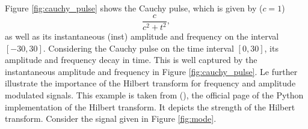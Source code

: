 \documentclass[../Main/thesis.tex]{subfiles}
\begin{document}
\justify
Figure \ref{fig:cauchy_pulse} shows the Cauchy pulse, which is given by ($c=1$)
\begin{equation}
	 \frac{c}{c^{2}+ t^{2}},
\end{equation}
as well as its instantaneous (inst) amplitude and frequency on the interval $[-30, 30]$. Considering the Cauchy pulse on the time interval $[0,30]$, its amplitude and frequency decay in time. This is well captured by the instantaneous amplitude and frequency in Figure \ref{fig:cauchy_pulse}.
\justify
Le further illustrate the importance of the Hilbert transform for frequency and amplitude modulated signals. This example is taken from (\cite{scipy2019}), the official page of the Python implementation of the Hilbert transform. It depicts the strength of the Hilbert transform. Consider the signal given in Figure \ref{fig:mode}. 
\end{document}
